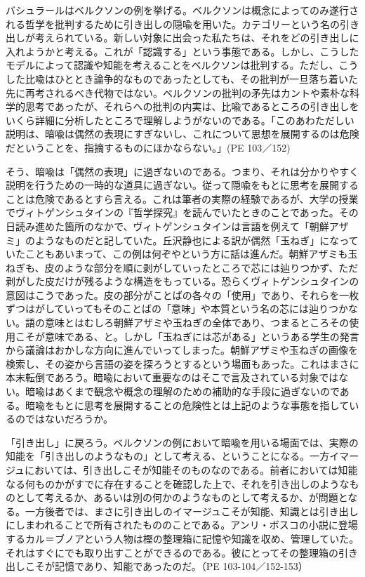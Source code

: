 \documentclass[b5j,twoside,twocolumn]{utarticle}
\begin{document}
バシュラールはベルクソンの例を挙げる。ベルクソンは概念によってのみ遂行される哲学を批判するために引き出しの隠喩を用いた。カテゴリーという名の引き出しが考えられている。新しい対象に出会った私たちは、それをどの引き出しに入れようかと考える。これが「認識する」という事態である。しかし、こうしたモデルによって認識や知能を考えることをベルクソンは批判する。ただし、こうした比喩はひととき論争的なものであったとしても、その批判が一旦落ち着いた先に再考されるべき代物ではない。ベルクソンの批判の矛先はカントや素朴な科学的思考であったが、それらへの批判の内実は、比喩であるところの引き出しをいくら詳細に分析したところで理解しようがないのである。「このあわただしい説明は、暗喩は偶然の表現にすぎないし、これについて思想を展開するのは危険だということを、指摘するものにほかならない。」(PE 103／152)


そう、暗喩は「偶然の表現」に過ぎないのである。つまり、それは分かりやすく説明を行うための一時的な道具に過ぎない。従って隠喩をもとに思考を展開することは危険であるとすら言える。これは筆者の実際の経験であるが、大学の授業でヴィトゲンシュタインの『哲学探究』を読んでいたときのことであった。その日読み進めた箇所のなかで、ヴィトゲンシュタインは言語を例えて「朝鮮アザミ」のようなものだと記していた。丘沢静也による訳が偶然「玉ねぎ」になっていたこともあいまって、この例は何ぞやという方に話は進んだ。朝鮮アザミも玉ねぎも、皮のような部分を順に剥がしていったところで芯には辿りつかず、ただ剥がした皮だけが残るような構造をもっている。恐らくヴィトゲンシュタインの意図はこうであった。皮の部分がことばの各々の「使用」であり、それらを一枚ずつはがしていってもそのことばの「意味」や本質という名の芯には辿りつかない。語の意味とはむしろ朝鮮アザミや玉ねぎの全体であり、つまるところその使用こそが意味である、と。しかし「玉ねぎには芯がある」というある学生の発言から議論はおかしな方向に進んでいってしまった。朝鮮アザミや玉ねぎの画像を検索し、その姿から言語の姿を探ろうとするという場面もあった。これはまさに本末転倒であろう。暗喩において重要なのはそこで言及されている対象ではない。暗喩はあくまで観念や概念の理解のための補助的な手段に過ぎないのである。暗喩をもとに思考を展開することの危険性とは上記のような事態を指しているのではないだろうか。


「引き出し」に戻ろう。ベルクソンの例において暗喩を用いる場面では、実際の知能を「引き出しのようなもの」として考える、ということになる。一方イマージュにおいては、引き出しこそが知能そのものなのである。前者においては知能なる何ものかがすでに存在することを確認した上で、それを引き出しのようなものとして考えるか、あるいは別の何かのようなものとして考えるか、が問題となる。一方後者では、まさに引き出しのイマージュこそが知能、知識とは引き出しにしまわれることで所有されたもののことである。アンリ・ボスコの小説に登場するカル＝ブノアという人物は樫の整理箱に記憶や知識を収め、管理していた。それはすぐにでも取り出すことができるのである。彼にとってその整理箱の引き出しこそが記憶であり、知能であったのだ。（PE 103-104／152-153）
\end{document}
